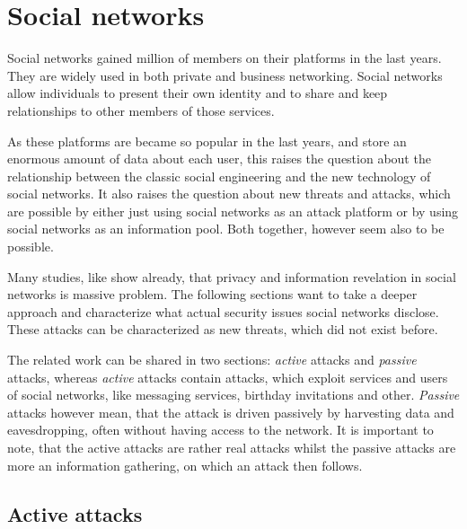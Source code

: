 \section{Social networks}

Social networks gained million of members on their platforms in the last years.
They are widely used in both private and business networking. Social networks
allow individuals to present their own identity and to share and keep
relationships to other members of those services.

As these platforms are became so popular in the last years, and store an
enormous amount of data about each user, this raises the question about the
relationship between the classic social engineering and the new technology of
social networks. It also raises the question about new threats and attacks,
which are possible by either just using social networks as an attack platform
or by using social networks as an information pool. Both together, however seem
also to be possible.

Many studies, like \cite{fraunhofer2008,gross2005} show already, that privacy
and information revelation in social networks is massive problem. The following
sections want to take a deeper approach and characterize what actual security
issues social networks disclose. These attacks can be characterized as new
threats, which did not exist before. 

The related work can be shared in two sections: \textit{active} attacks and
\textit{passive} attacks, whereas \textit{active} attacks contain attacks,
which exploit services and users of social networks, like messaging services,
birthday invitations and other.  \textit{Passive} attacks however mean, that
the attack is driven passively by harvesting data and eavesdropping, often
without having access to the network.  It is important to note, that the active
attacks are rather real attacks whilst the passive attacks are more an
information gathering, on which an attack then follows.

\subsection{Active attacks}
\label{subsection:active_attacks}

